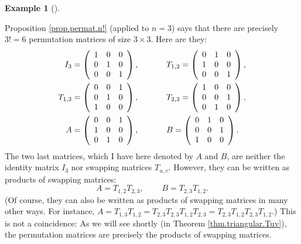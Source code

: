 \documentclass[numbers=enddot,12pt,final,onecolumn,notitlepage]{scrartcl}%
\theoremstyle{definition}
\newtheorem{exam}[theo]{Example}
\newenvironment{example}[1][]
{\begin{exam}[#1]\begin{leftbar}}
{\end{leftbar}\end{exam}}
\begin{document}
\begin{example}
Proposition \ref{prop.permat.n!} (applied to $n=3$) says that there are
precisely $3!=6$ permutation matrices of size $3\times3$. Here are they:%
\begin{align*}
I_{3}  &  =\left(
\begin{array}
[c]{ccc}%
1 & 0 & 0\\
0 & 1 & 0\\
0 & 0 & 1
\end{array}
\right)  ,\ \ \ \ \ \ \ \ \ \ T_{1,2}=\left(
\begin{array}
[c]{ccc}%
0 & 1 & 0\\
1 & 0 & 0\\
0 & 0 & 1
\end{array}
\right)  ,\\
T_{1,3}  &  =\left(
\begin{array}
[c]{ccc}%
0 & 0 & 1\\
0 & 1 & 0\\
1 & 0 & 0
\end{array}
\right)  ,\ \ \ \ \ \ \ \ \ \ T_{2,3}=\left(
\begin{array}
[c]{ccc}%
1 & 0 & 0\\
0 & 0 & 1\\
0 & 1 & 0
\end{array}
\right)  ,\\
A  &  =\left(
\begin{array}
[c]{ccc}%
0 & 0 & 1\\
1 & 0 & 0\\
0 & 1 & 0
\end{array}
\right)  ,\ \ \ \ \ \ \ \ \ \ B=\left(
\begin{array}
[c]{ccc}%
0 & 1 & 0\\
0 & 0 & 1\\
1 & 0 & 0
\end{array}
\right)  .
\end{align*}
The two last matrices, which I have here denoted by $A$ and $B$, are neither
the identity matrix $I_{3}$ nor swapping matrices $T_{u,v}$. However, they can
be written as products of swapping matrices:%
\[
A=T_{1,2}T_{2,3},\ \ \ \ \ \ \ \ \ \ B=T_{2,3}T_{1,2}.
\]
(Of course, they can also be written as products of swapping matrices in many
other ways. For instance, $A=T_{1,3}T_{1,2}=T_{2,3}T_{2,3}T_{1,2}%
T_{2,3}=T_{2,3}T_{1,2}T_{2,3}T_{1,2}$.) This is not a coincidence: As we will
see shortly (in Theorem \ref{thm.triangular.Tuv}), the permutation matrices
are precisely the products of swapping matrices.
\end{example}
\end{document}
